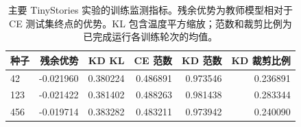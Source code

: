 \begin{table}[!t]\centering
\begin{tabular}{lrrrrr}
\toprule
种子 & 残余优势 & KD KL & CE 范数 & KD 范数 & KD 裁剪比例 \\
\midrule
42 & -0.021960 & 0.380224 & 0.486891 & 0.973546 & 0.236891 \\
123 & -0.021422 & 0.381402 & 0.488263 & 0.981438 & 0.283344 \\
456 & -0.019714 & 0.383282 & 0.483211 & 0.973942 & 0.240090 \\
\bottomrule
\end{tabular}
\caption{主要 TinyStories 实验的训练监测指标。残余优势为教师模型相对于 CE 测试集终点的优势。KL 包含温度平方缩放；范数和裁剪比例为已完成运行各训练轮次的均值。}\label{tab:tinystories_optimization}
\end{table}
